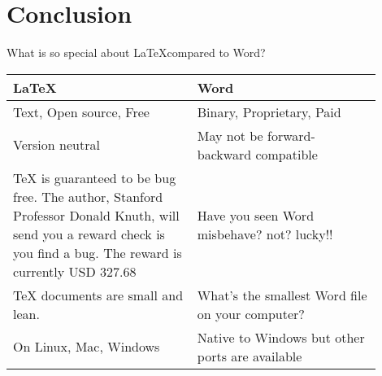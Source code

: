\section{Conclusion}
%

\begin{frame}{What is so special about \LaTeX \thickspace compared to Word?}
\begin{tabular}{@{}p{0.45\linewidth} | p{0.45\linewidth}@{}}\toprule
\textbf{\LaTeX} & \textbf{Word}\\ \midrule
Text, Open source, Free 		& Binary, Proprietary, Paid \\
Version neutral				& May not be forward-backward compatible\\
TeX is guaranteed to be bug free. The author, Stanford Professor Donald Knuth, will send you a reward check is you find a bug. The reward is currently USD 327.68 & Have you seen Word misbehave? not? lucky!!\\
TeX documents are small and lean. & What's the smallest Word file on your computer?\\
On Linux, Mac, Windows		& Native to Windows but other ports are available\\
\bottomrule
\end{tabular}
\end{frame}



